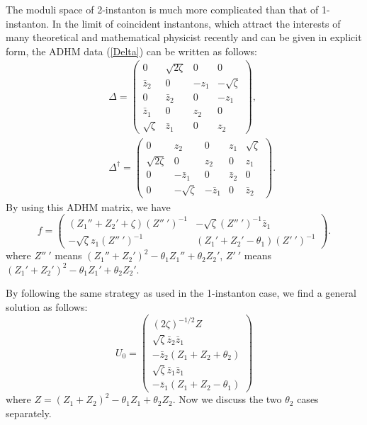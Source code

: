 \documentclass[a4paper,a4paper]{article}
\begin{document}
The moduli space of 2-instanton is much more complicated than that
of 1-instanton. In the limit of coincident instantons, which
attract the interests of many theoretical and mathematical
physicist recently and can be given in explicit form, the ADHM
data (\ref{Delta}) can be written as follows:
\begin{eqnarray}
& & \Delta=\left(\begin{array}{cccc} 0 &\sqrt{2\zeta}& 0 & 0\\
\bar z_2 & 0 & -z_1 & -\sqrt{\zeta}\\
0 & \bar z_2 & 0 & -z_1\\
\bar z_1 & 0 & z_2 & 0\\
\sqrt{\zeta}&\bar z_1 & 0 & z_2 \end{array}\right),
\\
& &  \Delta^\dag=\left(\begin{array}{ccccc} 0 & z_2 & 0 & z_1 &
\sqrt{\zeta}\\
\sqrt{2\zeta}& 0 & z_2 & 0 & z_1\\
0 & -\bar z_1 & 0 & \bar z_2 & 0\\
0 & -\sqrt{\zeta}& -\bar z_1 & 0 &\bar z_2 \end{array}\right).
\end{eqnarray}
By using this ADHM matrix, we have
\begin{equation}
f=\left(\begin{array}{cc} (Z_1''+Z_2'+\zeta)(Z''~')^{-1}
& -\sqrt{\zeta}(Z''~')^{-1}\bar z_1\\
-\sqrt{\zeta}z_1(Z''~')^{-1}& (Z_1'+Z_2'-\theta_1)(Z'~')^{-1}
\end{array}\right).
\end{equation}
where $Z''~'$ means $(Z_1''+Z_2')^2-\theta_1 Z_1''+\theta_2 Z_2'$,
$Z'~'$ means $(Z_1'+Z_2')^2-\theta_1 Z_1'+\theta_2 Z_2'$.

By following the same strategy as used in the 1-instanton case, we
find a general solution as follows:
\begin{equation}
U_0=\left(\begin{array}{c} (2\zeta)^{-1/2}Z\\
\sqrt{\zeta}\bar z_2\bar z_1\\
-\bar z_2(Z_1+Z_2+\theta_2)\\
\sqrt{\zeta}\bar z_1\bar z_1\\
-\bar z_1(Z_1+Z_2-\theta_1) \end{array}\right)
\end{equation}
where $Z=(Z_1+Z_2)^2-\theta_1 Z_1 +\theta_2 Z_2$. Now we discuss
the two $\theta_2$ cases separately.
\end{document}
